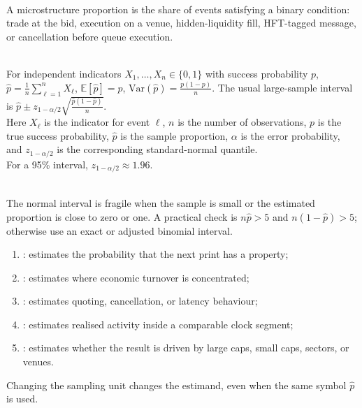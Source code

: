\begin{definition} \\
A microstructure proportion is the share of events satisfying a binary condition: trade at the bid, execution on a venue, hidden-liquidity fill, HFT-tagged message, or cancellation before queue execution.
\end{definition}

\begin{model} \\
For independent indicators $X_1,\ldots,X_n\in\{0,1\}$ with success probability $p$,\\
$\hat{p}=\frac{1}{n}\sum\limits_{\ell=1}^{n}X_\ell$, $\mathbb{E}[\hat{p}]=p$, $\mathrm{Var}(\hat{p})=\frac{p(1-p)}{n}$. The usual large-sample interval is $\hat{p}\pm z_{1-\alpha/2}\sqrt{\frac{\hat{p}(1-\hat{p})}{n}}$.\\
Here $X_\ell$ is the indicator for event $\ell$, $n$ is the number of observations, $p$ is the true success probability, $\hat{p}$ is the sample proportion, $\alpha$ is the error probability, and $z_{1-\alpha/2}$ is the corresponding standard-normal quantile.\\
For a 95\% interval, $z_{1-\alpha/2}\approx1.96$.
\end{model}

\begin{caveat} \\
The normal interval is fragile when the sample is small or the estimated proportion is close to zero or one. A practical check is $n\hat{p}>5$ and $n(1-\hat{p})>5$; otherwise use an exact or adjusted binomial interval.
\end{caveat}

\begin{taxonomy} 
\begin{enumerate}[label=\roman*.]
\setlength{\itemsep}{0pt}
\item {}: estimates the probability that the next print has a property;
\item {}: estimates where economic turnover is concentrated;
\item {}: estimates quoting, cancellation, or latency behaviour;
\item {}: estimates realised activity inside a comparable clock segment;
\item {}: estimates whether the result is driven by large caps, small caps, sectors, or venues.
\end{enumerate}
Changing the sampling unit changes the estimand, even when the same symbol $\hat{p}$ is used.
\end{taxonomy}

